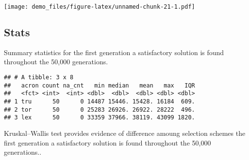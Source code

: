 \documentclass[]{book}
\newenvironment{Shaded}{\begin{snugshade}}{\end{snugshade}}
\newcommand{\DataTypeTok}[1]{\textcolor[rgb]{0.13,0.29,0.53}{#1}}
\newcommand{\KeywordTok}[1]{\textcolor[rgb]{0.13,0.29,0.53}{\textbf{#1}}}
\newcommand{\NormalTok}[1]{#1}
\newcommand{\OperatorTok}[1]{\textcolor[rgb]{0.81,0.36,0.00}{\textbf{#1}}}
\newcommand{\OtherTok}[1]{\textcolor[rgb]{0.56,0.35,0.01}{#1}}
\newcommand{\StringTok}[1]{\textcolor[rgb]{0.31,0.60,0.02}{#1}}
\begin{document}
\texttt{[image: demo\_files/figure-latex/unnamed-chunk-21-1.pdf]}

\hypertarget{stats-3}{%
\subsection{Stats}\label{stats-3}}

Summary statistics for the first generation a satisfactory solution is found throughout the 50,000 generations.

\begin{Shaded}
\end{Shaded}

\begin{verbatim}
## # A tibble: 3 x 8
##   acron count na_cnt   min median   mean   max   IQR
##   <fct> <int>  <int> <dbl>  <dbl>  <dbl> <dbl> <dbl>
## 1 tru      50      0 14487 15446. 15428. 16184  609.
## 2 tor      50      0 25283 26926. 26922. 28222  496.
## 3 lex      50      0 33359 37966. 38119. 43099 1820.
\end{verbatim}

Kruskal--Wallis test provides evidence of difference amoung selection schemes the first generation a satisfactory solution is found throughout the 50,000 generations..
\end{document}

